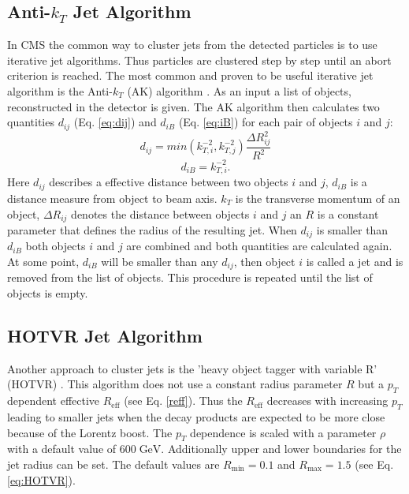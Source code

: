 \subsection{Anti-$k_T$ Jet Algorithm}
	In CMS the common way to cluster jets from the detected particles is to use iterative jet algorithms. Thus particles are clustered step by step until an abort criterion is reached. The most common and proven to be useful iterative jet algorithm is the Anti-$k_T$ (AK) algorithm \cite{antikt}. As an input a list of objects, reconstructed in the detector is given. The AK algorithm then calculates two quantities $d_{ij}$ (Eq. \ref{eq:dij}) and $d_{iB}$ (Eq. \ref{eq:iB}) for each pair of objects $i$ and $j$:
	\begin{equation}
	d_{ij} = min (k_{T,i}^{-2}, k_{T,j}^{-2})  \frac{\Delta R_{ij}^2}{R^2}
	\label{eq:dij}
	\end{equation}
	\begin{equation}
	d_{iB} = k_{T,i}^{-2}.
	\label{eq:iB}
	\end{equation}
	Here $d_{ij}$ describes a effective distance between two objects $i$ and $j$, $d_{iB}$ is a distance measure from object to beam axis. $k_T$ is the transverse momentum of an object, $\Delta R_{ij}$ denotes the distance between objects $i$ and $j$ an $R$ is a constant parameter that defines the radius of the resulting jet. When $d_{ij}$ is smaller than $d_{iB}$ both objects $i$ and $j$ are combined and both quantities are calculated again. At some point, $d_{iB}$ will be smaller than any $d_{ij}$, then object $i$ is called a jet and is removed from the list of objects. This procedure is repeated until the list of objects is empty.
	

\subsection{HOTVR Jet Algorithm}
	Another approach to cluster jets is the 'heavy object tagger with variable R' (HOTVR) \cite{hotvr}. This algorithm does not use a constant radius parameter $R$ but a $p_T$ dependent effective $R_\text{eff}$ (see Eq. \ref{reff}). Thus the $R_\text{eff}$ decreases with increasing $p_T$ leading to smaller jets when the decay products are expected to be more close because of the Lorentz boost. The $p_T$ dependence is scaled with a parameter $\rho$ with a default value of $600\;\text{GeV}$. Additionally upper and lower boundaries for the jet radius can be set. The default values are $R_\text{min} = 0.1$ and $R_\text{max} = 1.5$ (see Eq. \ref{eq:HOTVR}).
	
